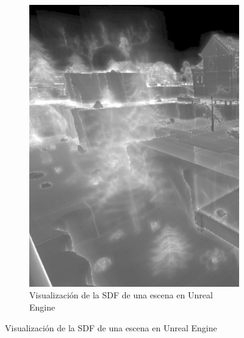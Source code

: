\begin{figure}[!h]
\begin{subfigure}[b]{0.45\textwidth}
        \includegraphics[width=\textwidth]{Plantilla-TFG-master/img/sdf_unreal.png}
        \caption{Visualización de la SDF de una escena en Unreal Engine \cite{unreal}}
    \end{subfigure}
    \hfill
\end{figure}


